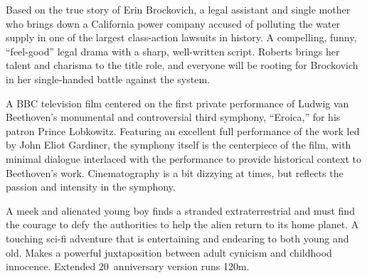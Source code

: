    Based on the true story of Erin Brockovich, a legal assistant and single mother who brings down a California power company accused of polluting the water supply in one of the largest class-action lawsuits in history. A compelling, funny, ``feel-good'' legal drama with a sharp, well-written script. Roberts brings her talent and charisma to the title role, and everyone will be rooting for Brockovich in her single-handed battle against the system. \author{DW} 

   A BBC television film centered on the first private performance of Ludwig van Beethoven's monumental and controversial third symphony, ``Eroica,'' for his patron Prince Lobkowitz. Featuring an excellent full performance of the work led by John Eliot Gardiner, the symphony itself is the centerpiece of the film, with minimal dialogue interlaced with the performance to provide historical context to Beethoven's work. Cinematography is a bit dizzying at times, but reflects the passion and intensity in the symphony. \author{DW}

   A meek and alienated young boy finds a stranded extraterrestrial and must find the courage to defy the authorities to help the alien return to its home planet. A touching sci-fi adventure that is entertaining and endearing to both young and old. Makes a powerful juxtaposition between adult cynicism and childhood innocence. Extended 20\th\ anniversary version runs 120m. \author{DW} 
